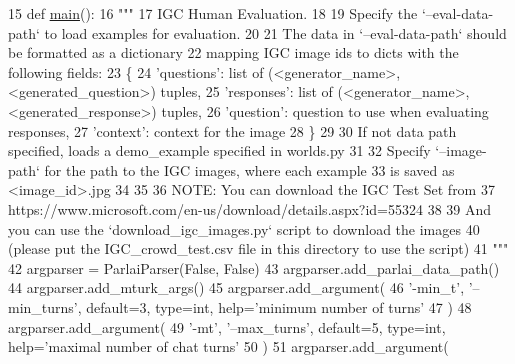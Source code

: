 \begin{DoxyCode}
15 \textcolor{keyword}{def }\hyperlink{namespaceprojects_1_1wizard__of__wikipedia_1_1mturk__evaluation__task_1_1run_ad3ab2c71f8083c3112815c0b363d316b}{main}():
16     \textcolor{stringliteral}{"""}
17 \textcolor{stringliteral}{    IGC Human Evaluation.}
18 \textcolor{stringliteral}{}
19 \textcolor{stringliteral}{    Specify the `--eval-data-path` to load examples for evaluation.}
20 \textcolor{stringliteral}{}
21 \textcolor{stringliteral}{    The data in `--eval-data-path` should be formatted as a dictionary}
22 \textcolor{stringliteral}{    mapping IGC image ids to dicts with the following fields:}
23 \textcolor{stringliteral}{    \{}
24 \textcolor{stringliteral}{        'questions': list of (<generator\_name>, <generated\_question>) tuples,}
25 \textcolor{stringliteral}{        'responses': list of (<generator\_name>, <generated\_response>) tuples,}
26 \textcolor{stringliteral}{        'question': question to use when evaluating responses,}
27 \textcolor{stringliteral}{        'context': context for the image}
28 \textcolor{stringliteral}{    \}}
29 \textcolor{stringliteral}{}
30 \textcolor{stringliteral}{    If not data path specified, loads a demo\_example specified in worlds.py}
31 \textcolor{stringliteral}{}
32 \textcolor{stringliteral}{    Specify `--image-path` for the path to the IGC images, where each example}
33 \textcolor{stringliteral}{    is saved as <image\_id>.jpg}
34 \textcolor{stringliteral}{}
35 \textcolor{stringliteral}{}
36 \textcolor{stringliteral}{    NOTE: You can download the IGC Test Set from}
37 \textcolor{stringliteral}{        https://www.microsoft.com/en-us/download/details.aspx?id=55324}
38 \textcolor{stringliteral}{}
39 \textcolor{stringliteral}{    And you can use the `download\_igc\_images.py` script to download the images}
40 \textcolor{stringliteral}{    (please put the IGC\_crowd\_test.csv file in this directory to use the script)}
41 \textcolor{stringliteral}{    """}
42     argparser = ParlaiParser(\textcolor{keyword}{False}, \textcolor{keyword}{False})
43     argparser.add\_parlai\_data\_path()
44     argparser.add\_mturk\_args()
45     argparser.add\_argument(
46         \textcolor{stringliteral}{'-min\_t'}, \textcolor{stringliteral}{'--min\_turns'}, default=3, type=int, help=\textcolor{stringliteral}{'minimum number of turns'}
47     )
48     argparser.add\_argument(
49         \textcolor{stringliteral}{'-mt'}, \textcolor{stringliteral}{'--max\_turns'}, default=5, type=int, help=\textcolor{stringliteral}{'maximal number of chat turns'}
50     )
51     argparser.add\_argument(

\end{DoxyCode}
